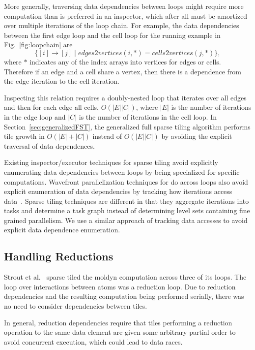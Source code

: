 More generally, traversing data dependencies between loops might require more computation
than is preferred in an inspector, which after all must be amortized over multiple iterations of the loop chain.
For example, the data dependencies between the first edge loop and the 
cell loop for the running example in Fig.~\ref{fig:loopchain} are
\[
	\{ [ i ] \rightarrow [ j ] \; | \; edges2vertices(i,*)=cells2vertices(j,*) \},
\]
where $*$ indicates any of the index arrays into vertices for edges or cells.
Therefore if an edge and a cell share a vertex, then there is a dependence from the edge
iteration to the cell iteration.

Inspecting this relation requires a doubly-nested loop that iterates
over all edges and then for each edge all cells, $O(|E|  |C|)$, where
$|E|$ is the number of iterations in the edge loop and $|C|$ is the number
of iterations in the cell loop.
In Section~\ref{sec:generalizedFST}, the generalized full sparse tiling
algorithm performs tile growth in $O(|E| + |C|)$ instead of $O(|E|  |C|)$
by avoiding the explicit traversal of data dependences.

Existing inspector/executor techniques for sparse tiling avoid
explicitly enumerating data dependencies between loops by being specialized
for specific computations.  Wavefront parallelization techniques
for do across loops also avoid explicit enumeration of data dependencies
by tracking how iterations access data~\citep{Rauchwerger:1998:RTP}.
Sparse tiling techniques are different in that they aggregate iterations into tasks
and determine a task graph instead of determining level sets containing fine
grained parallelism.  We use a similar approach of tracking data accesses
to avoid explicit data dependence enumeration.



\subsection{Handling Reductions}
\label{sec:reduction}

Strout et al.~\cite{ST-StroutPLDI03} sparse tiled the moldyn computation
across three of its loops.  The loop over interactions between atoms
was a reduction loop.  Due to reduction dependencies and the resulting computation being performed
serially, there was no need to consider dependencies between tiles.

In general, reduction dependencies require that
tiles performing a reduction operation to the same data element
are given some arbitrary
partial order to avoid concurrent execution, which could lead to data races.


